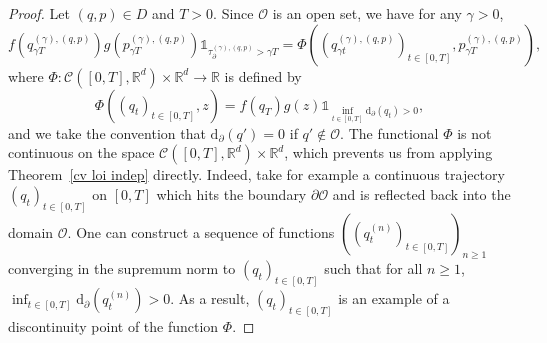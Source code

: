 \documentclass[preprint,EJP]{ejpecp}
\begin{document}
\begin{proof}Let $(q,p)\in D$ and $T>0$. Since $\mathcal{O}$ is an open set, we have for any $\gamma>0$,
\begin{equation*}
  f(q^{(\gamma),(q,p)}_{\gamma T})g(p^{(\gamma),(q,p)}_{\gamma T}) \mathbb{1}_{\tau^{(\gamma),(q,p)}_\partial>\gamma T} = \Phi\left( (q^{(\gamma),(q,p)}_{\gamma t})_{t \in [0,T]}, p^{(\gamma),(q,p)}_{\gamma T}\right),
\end{equation*}
where $\Phi : \mathcal{C}([0,T],\mathbb{R}^d)\times\mathbb{R}^d \to \mathbb{R}$ is defined by
\begin{equation*}
  \Phi\left( (q_t)_{t \in [0,T]},z\right) = f(q_T)g(z)\mathbb{1}_{\inf_{t \in [0,T]} \mathrm{d}_\partial(q_t)>0},
\end{equation*}
and we take the convention that $\mathrm{d}_\partial(q')=0$ if $q' \not\in \mathcal{O}$. The functional $\Phi$ is not continuous on the space $\mathcal{C}([0,T],\mathbb{R}^d)\times\mathbb{R}^d$, which prevents us from applying Theorem~\ref{cv loi indep} directly. Indeed, take for example a continuous trajectory $(q_t)_{t\in[0,T]}$ on $[0,T]$ which hits the boundary $\partial\mathcal{O}$ and is reflected back into the domain $\mathcal{O}$. One can construct a sequence of functions $((q^{(n)}_t)_{t\in[0,T]})_{n\geq1}$ converging in the supremum norm to $(q_t)_{t\in[0,T]}$ such that for all $n\geq1$, $\inf_{t \in [0,T]} \mathrm{d}_\partial(q^{(n)}_t)>0$. As a result, $(q_t)_{t\in[0,T]}$ is an example of a discontinuity point of the function $\Phi$.


\end{proof}
\end{document}

